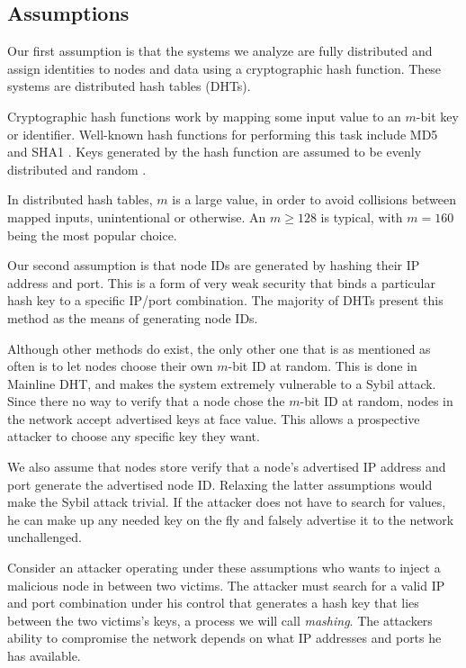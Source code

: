 \documentclass[11pt,conference]{IEEEtran}
\begin{document}
\subsection{Assumptions}


Our first assumption is that the systems we analyze are fully distributed and assign identities to nodes and data using a cryptographic hash function.
These systems are distributed hash tables (DHTs).

Cryptographic hash functions work by mapping some input value to an $m$-bit key or identifier.
Well-known hash functions for performing this task include MD5 \cite{md5} and SHA1 \cite{sha1}.
Keys generated by the hash function are assumed to be evenly distributed and random \cite{bellare2004hash}. 

In distributed hash tables, $m$ is a large value, in order to avoid collisions between mapped inputs, unintentional or otherwise. 
An $m \geq 128$ is typical, with $m = 160$ being the most popular choice.

Our second assumption is that node IDs are generated by hashing their IP address and port.
This is a form of very weak security that binds a particular hash key to a specific IP/port combination.
The majority of DHTs present this method as the means of generating node IDs. %

Although other methods do exist, the only other one that is as mentioned as often is to let nodes choose their own $m$-bit ID at random.
This is done in Mainline DHT, and makes the system extremely vulnerable to a Sybil attack.
Since there no way to verify that a node chose the $m$-bit ID at random, nodes in the network accept advertised keys at face value.
This allows a prospective attacker to choose any specific key they want.

We also assume that nodes store verify that a node's advertised IP address and port generate the advertised node ID.
Relaxing the latter assumptions would  make the Sybil attack trivial. 
If the attacker does not have to search for values, he can make up any needed key on the fly and falsely advertise it to the network unchallenged.

Consider an attacker operating under these assumptions who wants to inject a malicious node in between two victims.
The attacker must search for a valid IP and port combination under his control that generates a hash key that lies between the two victims's keys, a process we will call \textit{mashing}.
The attackers ability to compromise the network depends on what IP addresses and ports he has available.
\end{document}
